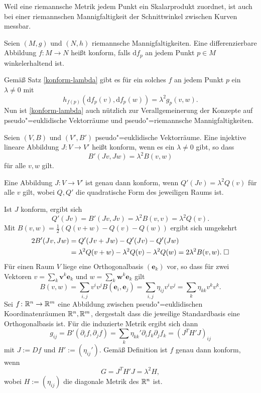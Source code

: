 Weil eine riemannsche Metrik jedem Punkt ein Skalarprodukt zuordnet,
ist auch bei einer riemannschen Mannigfaltigkeit der Schnittwinkel
zwischen Kurven messbar.
\begin{definition}
Seien $(M,g)$ und $(N,h)$ riemannsche Mannigfaltigkeiten. Eine
differenzierbare Abbildung $f\colon M\to N$ heißt konform,
falls $\mathrm df_p$ an jedem Punkt $p\in M$ winkelerhaltend ist.
\end{definition}
Gemäß Satz \ref{konform-lambda} gibt es für ein solches $f$ 
an jedem Punkt $p$ ein $\lambda\ne 0$ mit
\begin{equation}
h_{f(p)}(\mathrm df_p(v),\mathrm df_p(w)) = \lambda^2 g_p(v,w).
\end{equation}
Nun ist \ref{konform-lambda} auch nützlich zur Verallgemeinerung
der Konzepte auf pseudo"=euklidische Vektorräume
und pseudo"=riemannsche Mannigfaltigkeiten.
\begin{definition}
Seien $(V,B)$ und $(V',B')$ pseudo"=euklidische Vektorräume.
Eine injektive lineare Abbildung $J: V\to V'$ heißt konform, wenn
es ein $\lambda\ne 0$ gibt, so dass%
\begin{equation}
B'(Jv,Jw) = \lambda^2 B(v,w)
\end{equation}
für alle $v,w$ gilt.
\end{definition}
\begin{corollary}
Eine Abbildung $J\colon V\to V'$ ist genau dann konform, wenn
$Q'(Jv)=\lambda^2 Q(v)$ für alle $v$ gilt, wobei $Q,Q'$
die quadratische Form des jeweiligen Raums ist.
\end{corollary}
 Ist $J$ konform, ergibt sich
\begin{equation}
Q'(Jv) = B'(Jv,Jv) = \lambda^2 B(v,v) = \lambda^2 Q(v).
\end{equation}
Mit $B(v,w) = \frac{1}{2}(Q(v+w)-Q(v)-Q(w))$ ergibt sich umgekehrt
\begin{align}
2B'(Jv,Jw) &= Q'(Jv+Jw)-Q'(Jv)-Q'(Jw)\\
&= \lambda^2 Q(v+w) - \lambda^2 Q(v) - \lambda^2 Q(w)
= 2\lambda^2 B(v,w).\;\Box
\end{align}
Für einen Raum $V$ liege eine Orthogonalbasis $(\mathbf e_k)$ vor, so dass
für zwei Vektoren $v=\sum_k\mathbf v^k\mathbf e_k$ und $w=\sum_k\mathbf w^k\mathbf e_k$
gilt
\begin{equation}
B(v,w) = \sum_{i,j} v^i v^j B(\mathbf e_i,\mathbf e_j)
= \sum_{i,j}\eta_{ij} v^i v^j = \sum_{k}\eta_{kk}v^k v^k.
\end{equation}
Sei $f\colon\mathbb R^n\to\mathbb R^m$ eine Abbildung zwischen pseudo"=euklidischen
Koordinatenräumen $\mathbb R^n,\mathbb R^m$, dergestalt dass die jeweilige
Standardbasis eine Orthogonalbasis ist. Für die induzierte Metrik
ergibt sich dann
\begin{equation}
g_{ij} = B'(\partial_i f,\partial_j f)
= \sum_{k} \eta_{kk}'\partial_i f_k\partial_j f_k
= (J^T H' J)_{ij}
\end{equation}
mit $J:=Df$ und $H':=(\eta_{ij}')$. Gemäß Definition ist $f$ genau
dann konform, wenn
\begin{equation}
G = J^T H' J = \lambda^2 H,
\end{equation}
wobei $H:=(\eta_{ij})$ die diagonale Metrik des $\mathbb R^n$ ist.


